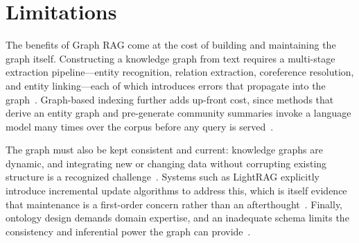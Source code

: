 \section{Limitations}
\label{sec:gr-limitations}

The benefits of Graph RAG come at the cost of building and maintaining the graph
itself. Constructing a knowledge graph from text requires a multi-stage extraction
pipeline---entity recognition, relation extraction, coreference resolution, and
entity linking---each of which introduces errors that propagate into the
graph~\cite{ji2021kgsurvey, shen2015entitylinking}. Graph-based indexing further
adds up-front cost, since methods that derive an entity graph and pre-generate
community summaries invoke a language model many times over the corpus before any
query is served~\cite{edge2024graphrag}.

The graph must also be kept consistent and current: knowledge graphs are dynamic,
and integrating new or changing data without corrupting existing structure is a
recognized challenge~\cite{hogan2021kg}. Systems such as LightRAG explicitly
introduce incremental update algorithms to address this, which is itself evidence
that maintenance is a first-order concern rather than an afterthought~\cite{guo2024lightrag}.
Finally, ontology design demands domain expertise, and an inadequate schema limits
the consistency and inferential power the graph can provide~\cite{gruber1993ontology,
hogan2021kg}.
